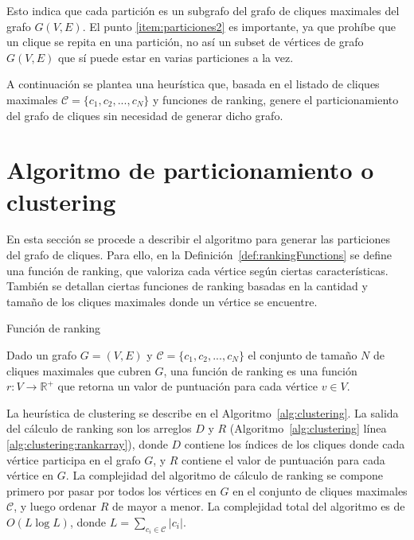 Esto indica que cada partición es un subgrafo del grafo de cliques maximales del grafo $G(V,E)$. El punto \ref{item:particiones2} es importante, ya que prohíbe que un clique se repita en una partición, no así un subset de vértices de grafo $G(V,E)$ que sí puede estar en varias particiones a la vez.

A continuación se plantea una heurística que, basada en el listado de cliques maximales $\mathcal{C} = \{c_{1}, c_{2}, ..., c_{N} \}$ y funciones de ranking, genere el particionamiento del grafo de cliques sin necesidad de generar dicho grafo.


\section{Algoritmo de particionamiento o clustering} \label{sec:PartitionAlgoritms}

En esta sección se procede a describir el algoritmo para generar las particiones del grafo de cliques. Para ello, en la Definición~\ref{def:rankingFunctions} se define una función de ranking, que valoriza cada vértice según ciertas características. También se detallan ciertas funciones de ranking basadas en la cantidad y tamaño de los cliques maximales donde un vértice se encuentre.

\begin{definition} 
	\label{def:rankingFunctions}
	Función de ranking
	
	Dado un grafo $G = (V, E)$ y $\mathcal{C} = \{c_{1}, c_{2}, ..., c_{N} \}$ el conjunto de tamaño $N$ de cliques maximales que cubren $G$, una función de ranking es una función $r: V \rightarrow \mathbb{R}^{+}$ que retorna un valor de puntuación para cada vértice $v \in V$.
\end{definition}

La heurística de clustering se describe en el Algoritmo~\ref{alg:clustering}. La salida del cálculo de ranking son los arreglos $D$ y $R$ (Algoritmo~\ref{alg:clustering} línea \ref{alg:clustering:rankarray}), donde $D$ contiene los índices de los cliques donde cada vértice participa en el grafo $G$, y $R$ contiene el valor de puntuación para cada vértice en $G$. La complejidad del algoritmo de cálculo de ranking se compone primero por pasar por todos los vértices en $G$ en el conjunto de cliques maximales $\mathcal{C}$, y luego ordenar $R$ de mayor a menor. La complejidad total del algoritmo es de $O(L \log L)$, donde $L=\sum_{c_i \in \mathcal{C}}|c_{i}|$.

